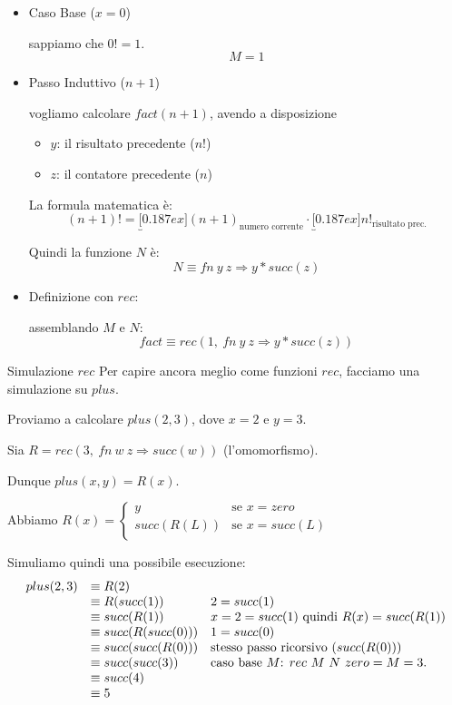 \documentclass[a4paper,11pt]{report}
\begin{document}
\begin{itemize}
    \item Caso Base (\( x = 0 \))

    sappiamo che \( 0! = 1 \).
    \[ M = 1 \]

    \item Passo Induttivo (\( n+1 \))

    vogliamo calcolare \( fact(n+1) \), avendo a disposizione
    \begin{itemize}
        \item \( y \): il risultato precedente (\( n! \))
        \item \( z \): il contatore precedente (\( n \))
    \end{itemize}

    La formula matematica è:  
    \[ (n+1)! = \underbracket[0.187ex]{(n+1)}_{\text{numero corrente}} \cdot \underbracket[0.187ex]{n!}_{\text{risultato prec.}} \]

    Quindi la funzione \( N \) è:
    \[ N \equiv fn \ y \ z \Rightarrow y * succ(z) \]

\item Definizione con \( rec \):

    assemblando \( M \) e \( N \):
    \[ fact \equiv rec(1, \ fn \ y \ z \Rightarrow y * succ(z)) \]
\end{itemize}

\begin{gframe}{Simulazione \( rec \)}
    Per capire ancora meglio come funzioni \( rec \), facciamo una simulazione su \( plus \).

Proviamo a calcolare $plus(2, 3)$, dove $x=2$ e $y=3$.

Sia $R = rec(3,\ fn\ w\ z \Rightarrow succ(w))$ (l'omomorfismo). 

Dunque $plus(x, y) = R(x)$.

Abbiamo \( R(x) = \begin{cases}
    y & \text{se } x = zero \\
    succ(R(L)) & \text{se } x = succ(L) \\
\end{cases} \)

Simuliamo quindi una possibile esecuzione:
\begin{displaymath}
\begin{array}{rll}
plus(2, 3) & \equiv R(2) \\
& \equiv R(succ(1)) & 2 = succ(1) \\
& \equiv succ(R(1)) & x = 2 = succ(1) \text{ quindi } R(x) = succ(R(1))\\
& \equiv succ(R(succ(0))) & 1 = succ(0) \\
& \equiv succ(succ(R(0))) & \text{stesso passo ricorsivo }(succ(R(0))) \\
& \equiv succ(succ(3)) & \text{caso base \( M \): } rec\ M\ N\ zero = M = 3. \\
& \equiv succ(4) & \\
& \equiv 5 & \\
\end{array}
\end{displaymath}
\end{gframe}
\end{document}

